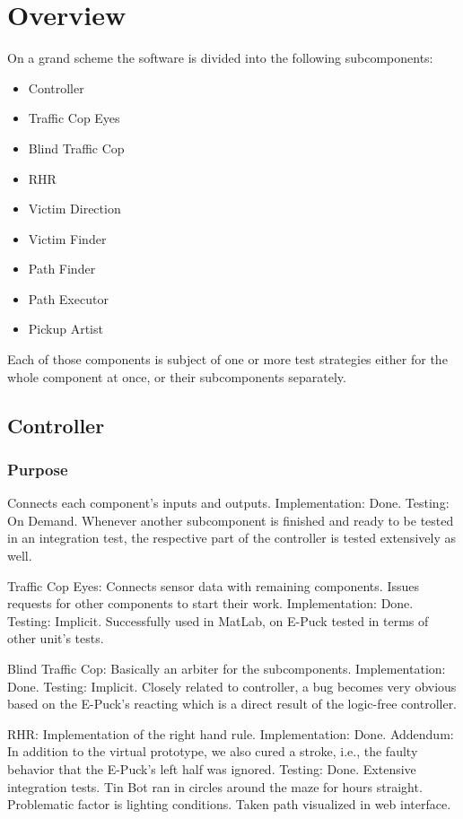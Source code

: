 \documentclass[a4paper,parskip,headheight=38pt]{scrartcl} %
\begin{document}
\section{Overview}

On a grand scheme the software is divided into the following subcomponents:

\begin{itemize}
	\item Controller
	\item Traffic Cop Eyes
	\item Blind Traffic Cop 
	\item RHR
	\item Victim Direction
	\item Victim Finder
	\item Path Finder
	\item Path Executor
	\item Pickup Artist
\end{itemize}

Each of those components is subject of one or more test strategies either for
the whole component at once, or their subcomponents separately.
\subsection{Controller}
\subsubsection{Purpose}
	Connects each component's inputs and outputs. 
Implementation: Done. 
Testing: On Demand. Whenever another subcomponent is finished and ready to be tested in an integration test, the respective part of the controller is tested extensively as well.

Traffic Cop Eyes:
Connects sensor data with remaining components. Issues requests for other components to start their work.
Implementation: Done.
Testing: Implicit. Successfully used in MatLab, on E-Puck tested in terms of other unit's tests.

Blind Traffic Cop:
Basically an arbiter for the subcomponents.
Implementation: Done.
Testing: Implicit. Closely related to controller, a bug becomes very obvious based on the E-Puck's reacting which is a direct result of the logic-free controller.

RHR:
Implementation of the right hand rule.
Implementation: Done. Addendum: In addition to the virtual prototype, we also cured a stroke, i.e., the faulty behavior that the E-Puck's left half was ignored.
Testing: Done. Extensive integration tests. Tin Bot ran in circles around the maze for hours straight. Problematic factor is lighting conditions. Taken path visualized in web interface.
\end{document}
